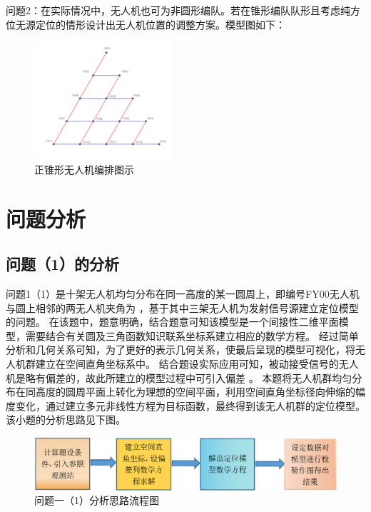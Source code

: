 问题2：在实际情况中，无人机也可为非圆形编队。若在锥形编队队形且考虑纯方位无源定位的情形设计出无人机位置的调整方案。模型图如下：

\begin{figure}[h]
    \centering
    \includegraphics[scale=0.7]{../res/regularTriangleFormation.png}
    \caption{正锥形无人机编排图示}
\end{figure}


%
%

\section{问题分析}

\subsection{问题（1）的分析}

问题1（1）是十架无人机均匀分布在同一高度的某一圆周上，即编号FY00无人机与圆上相邻的两无人机夹角为 ，基于其中三架无人机为发射信号源建立定位模型的问题。
在该题中，题意明确，结合题意可知该模型是一个间接性二维平面模型，需要结合有关圆及三角函数知识联系坐标系建立相应的数学方程。
经过简单分析和几何关系可知，为了更好的表示几何关系，使最后呈现的模型可视化，将无人机群建立在空间直角坐标系中。
结合题设实际应用可知，被动接受信号的无人机是略有偏差的，故此所建立的模型过程中可引入偏差 。
本题将无人机群均匀分布在同高度的圆周平面上转化为理想的空间平面，利用空间直角坐标径向伸缩的幅度变化，通过建立多元非线性方程为目标函数，最终得到该无人机群的定位模型。
该小题的分析思路见下图。

\begin{figure}[h]
    \centering
    \includegraphics[scale=0.3]{res/flowChart.png}
    \caption{问题一（1）分析思路流程图}
\end{figure}


